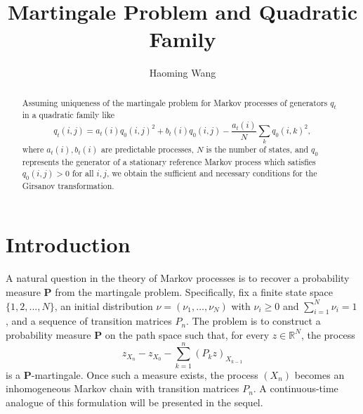 \documentclass{lms}
\title[Martingale Problem and Quadratic Family]%
 {Martingale Problem and Quadratic Family} %
\author{Haoming Wang}
\begin{document}
\maketitle

\begin{abstract}Assuming uniqueness of the martingale problem for Markov processes of generators $q_t$ in a quadratic family like
\[q_t(i,j) = a_t(i) q_0(i,j)^2 + b_t(i) q_0(i,j) - \frac{a_t(i)}{N} \sum_k q_0(i,k)^2,\]
where $a_t(i),b_t(i)$ are predictable processes, $N$ is the number of states, and $q_0$ represents the generator of a stationary reference Markov process which satisfies $q_0(i,j)>0$ for all $i,j$, we obtain the sufficient and necessary conditions for the Girsanov transformation.
\end{abstract}

\section{Introduction}

A natural question in the theory of Markov processes is to recover a probability measure $\mathbf{P}$ from the martingale problem. Specifically, fix a finite state space $\{1,2,\dots,N\}$, an initial distribution $\nu = (\nu_1,\dots,\nu_N)$ with $\nu_i \geq 0$ and $\sum_{i=1}^N \nu_i = 1$, and a sequence of transition matrices $P_n$. The problem is to construct a probability measure $\mathbf{P}$ on the path space such that, for every $z \in \mathbb{R}^N$, the process
$$
z_{X_n} - z_{X_0} - \sum_{k=1}^n (P_k z)_{X_{k-1}}
$$
is a $\mathbf{P}$-martingale. Once such a measure exists, the process $(X_n)$ becomes an inhomogeneous Markov chain with transition matrices $P_n$. A continuous-time analogue of this formulation will be presented in the sequel.
\end{document}
